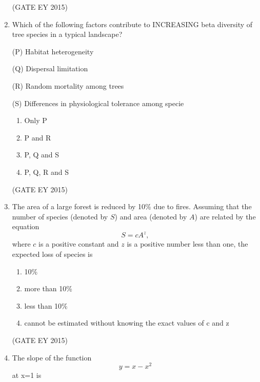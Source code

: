 \documentclass[journal,12pt,onecolumn]{IEEEtran}
\theoremstyle{remark}
\begin{document}
\begin{enumerate}
\begin{multicols}{2}
\begin{enumerate}
    \end{enumerate}
    \end{multicols}
\hfill{(GATE EY 2015)}




\item 
Which of the following factors contribute to INCREASING beta diversity of tree species in a typical landscape?

(P) Habitat heterogeneity

(Q) Dispersal limitation

(R) Random mortality among trees

(S) Differences in physiological tolerance among specie
\begin{multicols}{4}
\begin{enumerate}
    
\item  Only P
\item  P and R
\item P, Q and S
\item P, Q, R and S

    \end{enumerate}
    \end{multicols}
\hfill{(GATE EY 2015)}




\item 

The area of a large forest is reduced by 10\% due to fires. Assuming that the number of species (denoted by $S$) and area (denoted by $A$) are related by the equation 
\[ S = cA^z, \]
where $c$ is a positive constant and $z$ is a positive number less than one, the expected loss of species is



\begin{enumerate}
    
\item 10\%
\item more than 10\%
\item less than 10\%
\item cannot be estimated without knowing the exact values of c and z

    \end{enumerate}
    
\hfill{(GATE EY 2015)}



\item The slope of the function   \[y =x-x^2\] at x=1 is \underline{\hspace{1.5cm}}



\end{enumerate}
\end{document}
